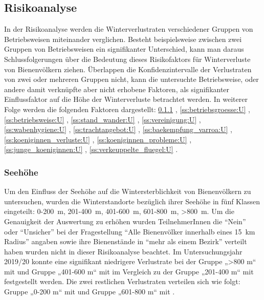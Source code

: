 \subsection{Risikoanalyse}

In der Risikoanalyse werden die Winterverlustraten verschiedener Gruppen von Betriebsweisen miteinander verglichen. Besteht beispielsweise zwischen zwei Gruppen von Betriebsweisen ein signifikanter Unterschied, kann man daraus Schlussfolgerungen über die Bedeutung dieses Risikofaktors für Winterverluste von Bienenvölkern ziehen. Überlappen die Konfidenzintervalle der Verlustraten von zwei oder mehreren Gruppen nicht, kann die untersuchte Betriebsweise, oder andere damit verknüpfte aber nicht erhobene Faktoren, als signifikanter Einflussfaktor auf die Höhe der Winterverluste betrachtet werden. In weiterer Folge werden die folgenden Faktoren dargestellt:
\ref{ss:seehoehe:U} ,
\ref{ss:betriebsgroesse:U} ,
\ref{ss:betriebsweise:U} ,
\ref{ss:stand_wander:U} ,
\ref{ss:vereinigung:U} ,
\ref{ss:wabenhygiene:U} ,
\ref{ss:trachtangebot:U} ,
\ref{ss:baekempfung_varroa:U} ,
\ref{ss:koeniginnen_verluste:U} ,
\ref{ss:koeniginnen_probleme:U} ,
\ref{ss:junge_koeniginnen:U} ,
\ref{ss:verkeuppelte_fluegel:U} .


\subsubsection{Seehöhe}
\label{ss:seehoehe:U}

Um den Einfluss der Seehöhe auf die Wintersterblichkeit von Bienenvölkern zu untersuchen, wurden die Winterstandorte bezüglich ihrer Seehöhe in fünf Klassen eingeteilt: 0-200~m, 201-400~m, 401-600~m, 601-800~m, >800~m. Um die Genauigkeit der Auswertung zu erhöhen wurden TeilnehmerInnen die \enquote{Nein} oder \enquote{Unsicher} bei der Fragestellung \enquote{Alle Bienenvölker innerhalb eines \SI{15}{\kilo\meter} Radius} angaben sowie ihre Bienenstände in \enquote{mehr als einem Bezirk} verteilt haben wurden nicht in dieser Risikoanalyse beachtet.
\newline
Im Untersuchungsjahr 2019/20 konnte eine signifikant niedrigere Verlustrate bei der Gruppe „>800 m`` mit 
und Gruppe „401-600 m`` mit  im Vergleich zu der Gruppe „201-400 m`` mit 
festgestellt werden.
\newline
Die zwei restlichen Verlustraten verteilen sich wie folgt: Gruppe „0-200 m`` mit  und Gruppe „601-800 m`` mit .

